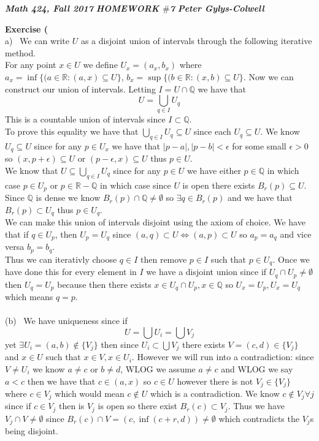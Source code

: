 \documentclass[12pt]{article}
\newenvironment{ques}[1]{\textbf{Exercise #1}\vspace{1 mm}\\ }{\bigskip}
\theoremstyle{definition}
\newcommand{\R}{\mathbb R}
\newcommand{\Q}{\mathbb Q}
\begin{document}
\noindent \textit{\textbf{Math 424, Fall 2017}} \hspace{1.3cm}
\textit{\textbf{HOMEWORK $\#$7}} \hspace{1.3cm} \textit{\textbf{Peter
Gylys-Colwell}} 

\vspace{1cm}

\begin{ques}{31}
	(a) \ We can write $U$ as a disjoint union of intervals through the
	following iterative method.\\
	For any point $x \in U$ we define $U_x = (a_x,b_x)$ where $a_x = \inf \{(a
	\in \R: (a,x) \subseteq U\}$, $b_x = \sup \{(b \in \R: (x,b) \subseteq
	U\}$. Now we can construct our union of intervals. Letting $I = U \cap \Q$
	we have that
	$$U = \bigcup_{q \in I} U_q$$
	This is a countable union of intervals since $I \subset \Q$.\\
	To prove this equality we have that $\bigcup_{q \in I} U_q \subseteq U$
	since each $U_q \subseteq U$. We know $U_q \subseteq U$ since for any $p
	\in U_x$ we have that $|p - a|, |p-b| < \epsilon$ for some small $\epsilon
	> 0$ so $(x,p + \epsilon) \subseteq U$ or $(p-\epsilon , x) \subseteq U$
	thus $p \in U$.\\
	We know that $U \subseteq \bigcup_{q \in I} U_q$ since for any $p \in U$ we
	have either $p \in \Q$ in which case $p \in U_p$ or $p \in \R - \Q$ in
	which case since $U$ is open there exists $B_r(p) \subseteq U$. Since $\Q$
	is dense we know $B_r(p) \cap \Q \neq \emptyset$ so $\exists q \in B_r(p)$
	and we have that $B_r(p) \subset U_q$ thus $p \in U_q$.\\
	We can make this union of intervals disjoint using the axiom of choice. We
	have that if $q \in U_p$, then $U_p = U_q$ since $(a,q) \subset U
	\Leftrightarrow (a,p) \subset U$ so $a_p = a_q$ and vice versa $b_p = b_q$.\\
	Thus we can iterativly choose $q \in I$ then remove $p \in I$ such that $p
	\in U_q$. Once we have done this for every element in $I$ we have a
	disjoint union since if $U_q \cap U_p \neq \emptyset$ then $U_q = U_p$
	because then there exists $x \in U_q \cap U_p, x \in \Q$ so $U_x = U_p, U_x = U_q$
	which means $q = p$.\\
	\\
	(b) \ We have uniqueness since if
	$$U = \bigcup U_i = \bigcup V_j$$
	yet $\exists U_i = (a,b) \notin \{V_j\}$ then since $U_i \subset \bigcup
	V_j$ there exists $V = (c,d) \in \{V_j\}$ and $x \in U$ such that $x \in V,
	x \in U_i$.  However we will run into a contradiction: since $V \neq U_i$
	we know $a \neq c$ or $b \neq d$, WLOG we assume $a \neq c$ and WLOG we say
	$a < c$ then we have that $c \in (a,x)$ so $c \in U$ however there is not
	$V_j \in \{V_j\}$ where $c \in V_j$ which would mean $c \notin U$ which is
	a contradiction. We know $c \notin V_j \forall j$ since if $c \in V_j$ then
	is $V_j$ is open so there exist $B_r(c) \subset V_j$. Thus we have $V_j
	\cap V \neq \emptyset$ since $B_r(c) \cap V = (c, \inf(c + r, d)) \neq
	\emptyset$ which contradicts the $V_j$s being disjoint.
\end{ques}
\end{document}

